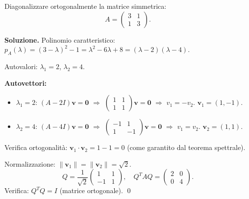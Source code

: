 \medskip

\begin{examplebox}
Diagonalizzare ortogonalmente la matrice simmetrica:
\[ A = \begin{pmatrix} 3 & 1 \\ 1 & 3 \end{pmatrix}. \]
\end{examplebox}

\textbf{Soluzione.} Polinomio caratteristico: $p_A(\lambda) = (3-\lambda)^2 - 1 = \lambda^2 - 6\lambda + 8 = (\lambda-2)(\lambda-4)$.

Autovalori: $\lambda_1 = 2$, $\lambda_2 = 4$.

\textbf{Autovettori:}
\begin{itemize}
    \item $\lambda_1 = 2$: $(A-2I)\mathbf{v} = \mathbf{0}$ $\Rightarrow$ $\begin{pmatrix} 1 & 1 \\ 1 & 1 \end{pmatrix}\mathbf{v} = \mathbf{0}$ $\Rightarrow$ $v_1 = -v_2$. $\mathbf{v}_1 = (1,-1)$.
    \item $\lambda_2 = 4$: $(A-4I)\mathbf{v} = \mathbf{0}$ $\Rightarrow$ $\begin{pmatrix} -1 & 1 \\ 1 & -1 \end{pmatrix}\mathbf{v} = \mathbf{0}$ $\Rightarrow$ $v_1 = v_2$. $\mathbf{v}_2 = (1,1)$.
\end{itemize}
Verifica ortogonalità: $\mathbf{v}_1 \cdot \mathbf{v}_2 = 1 - 1 = 0$ \checkmark{} (come garantito dal teorema spettrale).

Normalizzazione: $\|\mathbf{v}_1\| = \|\mathbf{v}_2\| = \sqrt{2}$.
\[ Q = \frac{1}{\sqrt{2}}\begin{pmatrix} 1 & 1 \\ -1 & 1 \end{pmatrix}, \quad Q^TAQ = \begin{pmatrix} 2 & 0 \\ 0 & 4 \end{pmatrix}. \]
Verifica: $Q^TQ = I$ \checkmark{} (matrice ortogonale). \qed

